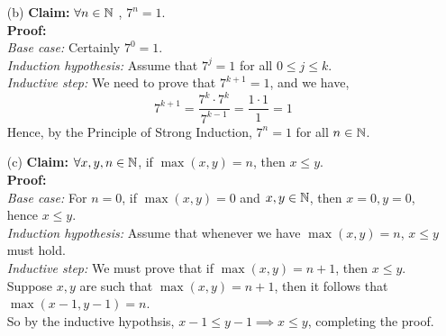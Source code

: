 \documentclass[11pt]{article}
\newif\ifsolutions
\begin{document}
\begin{qunlist}
\begin{itemize}
\ifsolutions
\textbf{Solutions:} The claim is clearly false as $2^2 > 2$, so the proof must be incorrect.\\
The base case and the induction hypothesis do not have any errors. The flaw lies in the inductive step.
In fact, working backwards, the proof \textit{implicitly} assumes that $(k+1)^2 \leq k+1$.
But this is what we are trying to prove, we cannot assume it!
\fi


\item[(b)]\textbf{Claim:} $\forall n \in \mathbb{N}$ , $7^n = 1$. \\
\textbf{Proof:} \\
\textit{Base case:} Certainly $7^0 = 1$. \\
\textit{Induction hypothesis:} Assume that $7^j = 1$ for all $0\leq j \leq k$.\\
\textit{Inductive step:} We need to prove that $7^{k+1} = 1$, and we have,
\[ 7^{k+1} = \frac{7^k \cdot 7^k}{7^{k-1}} = \frac{1 \cdot 1}{1} = 1\]
Hence, by the Principle of Strong Induction, $7^n = 1$ for all $n \in \mathbb{N}$.

\ifsolutions
\textbf{Solutions:} The claim is clearly false as $7 \ne 1$, so there must be an error in the proof.
The (strong) induction hypothesis is stated correctly, however, not all required base cases are checked.
The inductive step uses both $P(k)$ and $P(k-1)$ to prove $P(k+1)$, which breaks down for $k=0$.
When $k=0$, $k-1 = -1$ and $P(k-1)=P(-1)$ is not defined!
\fi



\item[(c)]\textbf{Claim:} $\forall x,y,n \in \mathbb{N}$, if $\max(x,y) = n$, then $x \leq y$. \\
\textbf{Proof:} \\
\textit{Base case:} For $n=0$, if $\max(x,y) = 0$ and $x,y \in \mathbb{N}$, then $x=0, y=0$, hence $x \leq y$. \\
\textit{Induction hypothesis:} Assume that whenever we have $\max(x,y) = n$, $x \leq y$ must hold. \\
\textit{Inductive step:} We must prove that if $\max(x,y) = n+1$, then $x \leq y$. \\
Suppose $x,y$ are such that $\max(x,y) = n+1$, then it follows that $\max(x-1,y-1) = n$. \\
So by the inductive hypothsis, $x-1 \leq y-1  \implies x \leq y$, completing the proof.


\end{itemize}
\end{qunlist}
\end{document}
